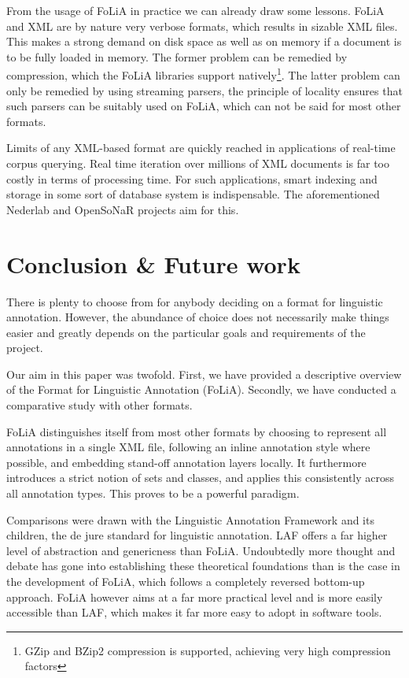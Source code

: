 \documentclass[a4paper,10pt,twoside]{article}
\begin{document}
From the usage of FoLiA in practice we can already draw some lessons. FoLiA and
XML are by nature very verbose formats, which results in sizable XML files.
This makes a strong demand on disk space as well as on memory if a document is
to be fully loaded in memory. The former problem can be remedied by
compression, which the FoLiA libraries support natively\footnote{GZip and BZip2
compression is supported, achieving very high compression factors}. The latter
problem can only be remedied by using streaming parsers, the principle of
locality ensures that such parsers can be suitably used on FoLiA, which can not
be said for most other formats.

Limits of any XML-based format are quickly reached in applications of real-time corpus
querying. Real time iteration over millions of XML documents is far too costly in terms
of processing time. For such applications, smart indexing and storage in some sort of
database system is indispensable. The aforementioned Nederlab and OpenSoNaR
projects aim for this. 

\section{Conclusion \& Future work}

There is plenty to choose from for anybody deciding on a format for
linguistic annotation. However, the abundance of choice does not necessarily make
things easier and greatly depends on the particular goals and requirements of the
project.  

Our aim in this paper was twofold. First, we have provided a descriptive
overview of the Format for Linguistic Annotation (FoLiA). Secondly, we have
conducted a comparative study with other formats.

FoLiA distinguishes itself from most other formats by choosing to represent
all annotations in a single XML file, following an inline annotation style where
possible, and embedding stand-off annotation layers locally. It furthermore
introduces a strict notion of sets and classes, and applies this consistently
across all annotation types. This proves to be a powerful paradigm.

Comparisons were drawn with the Linguistic Annotation Framework and its
children, the de jure standard for linguistic annotation. LAF offers a far
higher level of abstraction and genericness than FoLiA. Undoubtedly more
thought and debate has gone into establishing these theoretical foundations
than is the case in the development of FoLiA, which follows a completely
reversed bottom-up approach. FoLiA however aims at a far more practical level and is
more easily accessible than LAF, which makes it far more easy to adopt in
software tools. 
\end{document}
